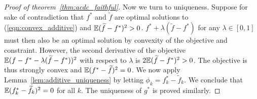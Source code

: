 \begin{proof}[Proof of theorem~\ref{thm:acdc_faithful}]
Now we turn to uniqueness. Suppose for sake of contradiction that
$f^*$ and $\tilde{f}$ are optimal solutions to
(\ref{eqn:convex_additive}) and ${\mathbb E} (\widetilde{f} - f^*)^2 > 0$.  $f^* +
\lambda ( \tilde{f} - f^*)$ for any $\lambda \in [0,1]$ must then also
be an optimal solution by convexity of the objective and
constraint. However, the second derivative of the objective ${\mathbb E}( f -
f^* - \lambda(\widetilde{f} - f^*))^2$ with respect to $\lambda$ is $2 {\mathbb E}(
\widetilde{f} - f^*)^2 > 0$. The objective is thus strongly convex and
${\mathbb E}(f^* - \widetilde{f})^2 = 0$. We now apply
Lemma~\ref{lem:additive_uniqueness} by letting $\phi_k = f^*_k -
\tilde{f}_k$. We conclude that ${\mathbb E} (f^*_k - \widetilde{f}_k)^2 = 0$ for
all $k$. The uniqueness of $g^*$ is proved similarly.
\end{proof}










